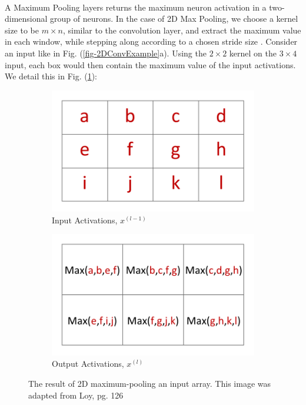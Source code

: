 \documentclass[12pt,letterpaper]{article}
\begin{document}
\paragraph*{}A Maximum Pooling layers returns the maximum neuron activation in a two-dimensional group of neurons. In the case of 2D Max Pooling, we choose a kernel size to be $m \times n$, similar to the convolution layer, and extract the maximum value in each window, while stepping along according to a chosen stride size \cite{Loy,Goodfellow}. Consider an input like in Fig. (\ref{fig-2DConvExample}a). Using the $2 \times 2$ kernel on the $3 \times 4$ input, each box would then contain the maximum value of the input activations. We detail this in Fig. (\ref{fig-2DMaxPool}):
\begin{figure}[H]
	\begin{subfigure}{0.45\textwidth}
	\includegraphics[scale=0.6]{../figures/2DConvExample(a)}
	\caption{Input Activations, $x^{(l-1)}$}
	\end{subfigure}
	\begin{subfigure}{0.45\textwidth}
	\includegraphics[scale=0.6]{../figures/2DConvExample(d)}
	\caption{Output Activations, $x^{(l)}$}
	\end{subfigure}
\caption{The result of 2D maximum-pooling an input array. This image was adapted from Loy, pg. 126 \cite{Loy}}
\label{fig-2DMaxPool}
\end{figure} 
\end{document}
